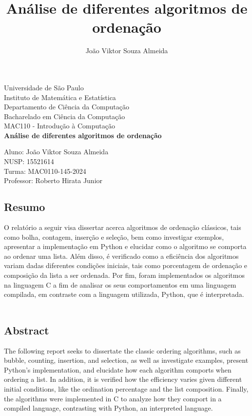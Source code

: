 \documentclass[10pt,a4paper]{article}
\author{João Viktor Souza Almeida}
\title{Análise de diferentes algoritmos de ordenação}
\begin{document}
\begin{titlepage} %
    \begin{center} %
    {\large Universidade de São Paulo}\\[0.2cm] %
    {\large Instituto de Matemática e Estatística}\\[0.2cm] %
    {\large Departamento de Ciência da Computação}\\[0.2cm]
    {\large Bacharelado em Ciência da Computação}\\[0.2cm]
    {\large MAC110 - Introdução à Computação}\\[5.1cm]
    {\bf \huge Análise de diferentes algoritmos de ordenação}\\[5.1cm] 
    \end{center} %
    {\large Aluno: João Viktor Souza Almeida}\\[0.7cm] %
    {\large NUSP: 15521614}\\[0.7cm] %
    {\large Turma: MAC0110-145-2024}\\[0.7cm] %
    {\large Professor: Roberto Hirata Junior}\\[5.1cm]
    \end{titlepage} %

\subsection*{Resumo}
O relatório a seguir visa dissertar acerca algoritmos de ordenação clássicos, tais como bolha, contagem, inserção e seleção, bem como investigar exemplos, apresentar a implementação em Python e elucidar como o algoritmo se comporta ao ordenar uma lista.
Além disso, é verificado como a eficiência dos algoritmos variam dadas diferentes condições iniciais, tais como porcentagem de ordenação e composição da lista a ser ordenada. 
Por fim, foram implementados os algoritmos na linguagem C a fim de analisar os seus comportamentos em uma linguagem compilada, em contraste com a linguagem utilizada, Python, que é interpretada.
\

\subsection*{Abstract}
The following report seeks to dissertate the classic ordering algorithms, such as bubble, counting, insertion, and selection, as well as investigate examples, present Python's implementation, and elucidate how each algorithm comports when ordering a list.
In addition, it is verified how the efficiency varies given different initial conditions, like the ordination percentage and the list composition.
Finally, the algorithms were implemented in C to analyze how they comport in a compiled language, contrasting with Python, an interpreted language.
\end{document}
